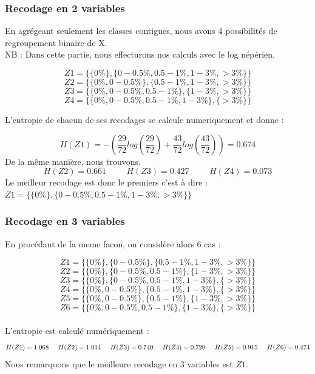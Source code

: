 \documentclass{article}
\begin{document}
\subsubsection{Recodage en 2 variables}

En agrégeant seulement les classes contigues, nous avons 4 possibilités de regroupement binaire de 
X.
\\
 NB : Dans cette partie, nous effecturons nos calculs avec le log népérien.


\[
Z1 =\{ \{0 \% \} , \{0 - 0.5 \% ,0.5-1 \% ,1-3 \% ,>3 \% \} \}  
\]
\[
Z2 =\{ \{0 \% , 0 - 0.5 \%  \} , \{0.5-1 \% ,1-3 \% ,>3 \% \} \}
\]
\[
Z3 =\{ \{0 \%, 0 - 0.5 \% ,0.5-1 \%  \} , \{1-3 \% ,>3 \% \} \}
\]
\[
Z4 =\{ \{0 \% , 0 - 0.5 \% ,0.5-1 \% ,1-3 \% \} , \{>3 \% \} \}
\]


L'entropie de chacun de ses recodages se calcule numeriquement et donne :

\[
H(Z1) = -\left(\frac{29}{72}log(\frac{29}{72})+\frac{43}{72}log(\frac{43}{72})\right) = 0.674
\]
De la même manière, nous trouvons.
\[
H(Z2) = 0.661 \hspace{1cm} H(Z3) = 0.427 \hspace{1cm} H(Z4) = 0.073
\]
Le meilleur recodage est donc le premiers c'est à dire :
$Z1 =\{ \{0 \% \} , \{0 - 0.5 \% ,0.5-1 \% ,1-3 \% ,>3 \% \} \}$


\subsubsection{Recodage en 3 variables}

En procédant de la meme facon, on considère alors 6 cas :

\[
Z1 =\{ \{0 \% \} , \{0 - 0.5 \%\} ,\{0.5-1 \% ,1-3 \% ,>3 \% \} \}  
\]
\[
  Z2 =\{ \{0 \% \} , \{0 - 0.5\%, 0.5-1 \% \} ,\{1-3 \% ,>3 \% \} \}
\]
\[
  Z3 =\{ \{0 \% \} , \{0 - 0.5\%, 0.5-1 \% ,1-3 \%  \} ,\{>3 \% \} \}
\]
\[
  Z4 =\{ \{0 \%, 0 - 0.5\%\} , \{ 0.5-1 \% ,1-3 \%  \} ,\{>3 \% \} \}
\]
\[
  Z5 =\{ \{0 \%, 0 - 0.5\%\} , \{ 0.5-1 \% \} ,\{1-3 \% , >3 \% \} \}
\]
\[
  Z6 =\{ \{0 \%, 0 - 0.5\%,  0.5-1 \% \} , \{1-3 \%  \} ,\{>3 \% \} \}
\]
\\
L'entropie est calculé numériquement :
\[
H(Z1) = 1.068 \hspace{0.5cm} H(Z2) = 1.014 \hspace{0.5cm} H(Z3) = 0.740 \hspace{0.5cm} H(Z4) = 0.720 \hspace{0,5cm} H(Z5) = 0.915 \hspace{0,5 cm} H(Z6) = 0.474
\]
Nous remarquons que le meilleure recodage en 3 variables est $Z1$.
\end{document}
